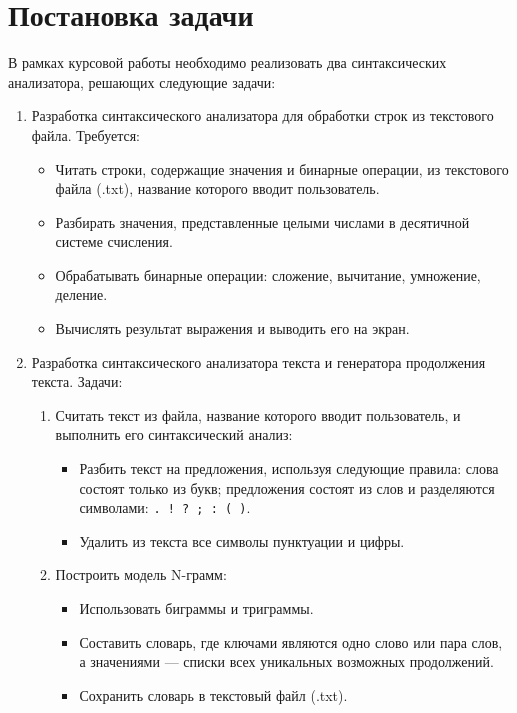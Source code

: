 \documentclass[a4paper, final]{article}
\begin{document}
\newpage
\newpage

\tableofcontents





\newpage
\section {Постановка задачи}

В рамках курсовой работы необходимо реализовать два синтаксических анализатора, решающих следующие задачи:

\begin{enumerate}
	\item Разработка синтаксического анализатора для обработки строк из текстового файла. Требуется:
	\begin{itemize}
		\item Читать строки, содержащие значения и бинарные операции, из текстового файла (.txt), название которого вводит пользователь.
		\item Разбирать значения, представленные целыми числами в десятичной системе счисления.
		\item Обрабатывать бинарные операции: сложение, вычитание, умножение, деление.
		\item Вычислять результат выражения и выводить его на экран.
	\end{itemize}
	
	\item Разработка синтаксического анализатора текста и генератора продолжения текста. Задачи:
	\begin{enumerate}
		\item Считать текст из файла, название которого вводит пользователь, и выполнить его синтаксический анализ:
		\begin{itemize}
			\item Разбить текст на предложения, используя следующие правила: слова состоят только из букв; предложения состоят из слов и разделяются символами: \texttt{. ! ? ; : ( )}.
			\item Удалить из текста все символы пунктуации и цифры.
		\end{itemize}
		
		\item Построить модель N-грамм:
		\begin{itemize}
			\item Использовать биграммы и триграммы.
			\item Составить словарь, где ключами являются одно слово или пара слов, а значениями — списки всех уникальных возможных продолжений.
			\item Сохранить словарь в текстовый файл (.txt).
		\end{itemize}
		

\end{enumerate}
\end{enumerate}
\end{document}
